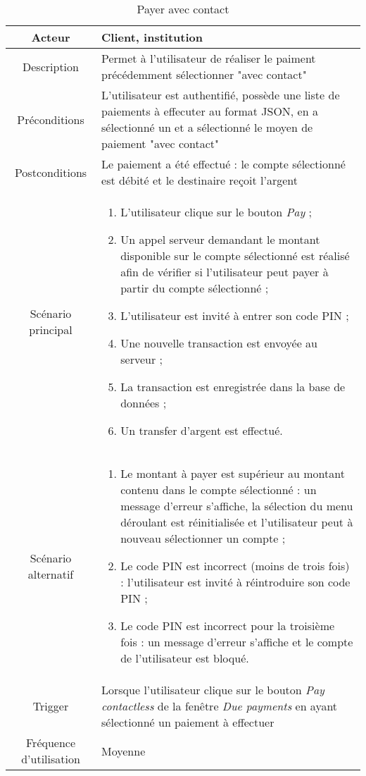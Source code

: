 \documentclass{article}
\begin{document}
\begin{table}

\begin{tabular}{|c|p{11cm}|}
\hline
Acteur & Client, institution \\
\hline
Description & Permet à l'utilisateur de réaliser le paiment précédemment sélectionner "avec contact" \\
\hline
Préconditions & L'utilisateur est authentifié, possède une liste de paiements à effecuter au format JSON, en a sélectionné un et a sélectionné le moyen de paiement "avec contact" \\
\hline
Postconditions & Le paiement a été effectué : le compte sélectionné est débité et le destinaire reçoit l'argent \\
\hline
Scénario principal & \begin{enumerate}
\item L'utilisateur clique sur le bouton \emph{Pay} ;
\item Un appel serveur demandant le montant disponible sur le compte sélectionné est réalisé afin de vérifier si l'utilisateur peut payer à partir du compte sélectionné ;
\item L'utilisateur est invité à entrer son code PIN ;
\item Une nouvelle transaction est envoyée au serveur ;
\item La transaction est enregistrée dans la base de données ;
\item Un transfer d'argent est effectué.
\end{enumerate} \\
\hline
Scénario alternatif & \begin{enumerate}
\item Le montant à payer est supérieur au montant contenu dans le compte sélectionné : un message d'erreur s'affiche, la sélection du menu déroulant est réinitialisée et l'utilisateur peut à nouveau sélectionner un compte ;
\item Le code PIN est incorrect (moins de trois fois) : l'utilisateur est invité à réintroduire son code PIN ;
\item Le code PIN est incorrect pour la troisième fois : un message d'erreur s'affiche et le compte de l'utilisateur est bloqué.
\end{enumerate} \\
\hline
Trigger & Lorsque l'utilisateur clique sur le bouton \emph{Pay contactless} de la fenêtre \emph{Due payments} en ayant sélectionné un paiement à effectuer \\
\hline
Fréquence d'utilisation & Moyenne \\
\hline
\end{tabular}

\caption{Payer avec contact}

\end{table}
\end{document}
